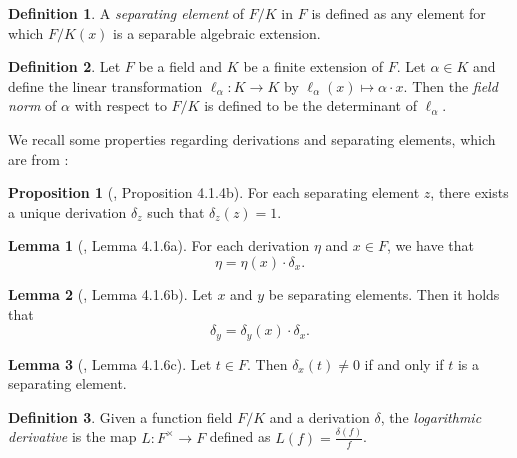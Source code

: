 \documentclass{article}
\theoremstyle{definition}
\newtheorem{proposition}{Proposition}
\newtheorem{definition}{Definition}
\newtheorem{lemma}{Lemma}
\newcommand{\6}{\mathbf}
\newcommand{\7}{\mathcal}
\begin{document}


\begin{definition}
    A \textit{separating element} of $F/K$ in $F$ is defined as any element for which $F/K(x)$ is a separable algebraic extension. 
\end{definition}


\begin{definition}
    Let $F$ be a field and $K$ be a finite extension of $F$. Let $\alpha \in K$ and define the linear transformation $\ell_{\alpha} : K \rightarrow K$ by $\ell_{\alpha}(x) \mapsto \alpha \cdot x$.
    Then the \textit{field norm} of $\alpha$ with respect to $F/K$ is defined to be the determinant of $\ell_{\alpha}$.
\end{definition}


We recall some properties regarding derivations and separating elements, which are from \cite{Stichtenoth93}:

  
\begin{proposition}[\cite{Stichtenoth93}, Proposition 4.1.4b]\label{prop:414b}
    For each separating element $z$, there exists a unique derivation $\delta_z$ such that $\delta_z(z) = 1$.
\end{proposition}


\begin{lemma}[\cite{Stichtenoth93}, Lemma 4.1.6a]\label{lemma:416a}
    For each derivation $\eta$ and $x \in F$, we have that
    $$\eta = \eta(x) \cdot \delta_x.$$ 
\end{lemma}


\begin{lemma}[\cite{Stichtenoth93}, Lemma 4.1.6b]\label{lemma:416b}
    Let $x$ and $y$ be separating elements. Then it holds that
    $$\delta_y = \delta_y(x) \cdot \delta_x.$$
\end{lemma}


\begin{lemma}[\cite{Stichtenoth93}, Lemma 4.1.6c]\label{lemma:416c}
    Let $t \in F$. Then $\delta_x(t) \neq 0$ if and only if $t$ is a separating element.
\end{lemma}


\begin{definition}
    Given a function field $F/K$ and a derivation $\delta$, the \textit{logarithmic derivative} is the map $L : F^{\times} \rightarrow F$ defined as $L(f) = \frac{\delta(f)}{f}$.
\end{definition}
\end{document}

